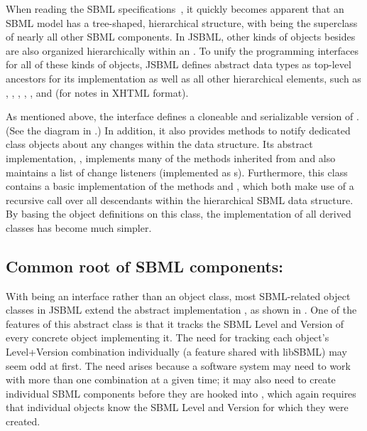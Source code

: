 When reading the SBML specifications~\citep{Hucka2003, Hucka2008,
  Hucka2010a},  it quickly becomes apparent that
an SBML model has a tree-shaped, hierarchical structure, with \SBase being
the superclass of nearly all other SBML components. In JSBML, other kinds of
objects besides \SBase are also organized hierarchically within an
\SBMLDocument.  To unify the programming interfaces for all of these kinds
of objects, JSBML defines abstract data types as top-level ancestors for
its \SBase implementation as well as all other hierarchical elements, such
as \Annotation, \ASTNode, \Creator, \CVTerm, \History, and \XMLNode (for
notes in XHTML  format).

As mentioned above, the interface \TreeNodeWithChangeSupport defines a
cloneable and serializable version of \TreeNode. (See the diagram in
.) In addition, it also provides methods to notify
dedicated \TreeNodeChangeListener class objects about any changes within
the data structure. Its abstract implementation, \AbstractTreeNode,
implements many of the methods inherited from \TreeNodeWithChangeSupport
and also maintains a list of change listeners (implemented as
\TreeNodeChangeListener{}s). Furthermore, this class contains a basic
implementation of the methods  and , which both
make use of a recursive call over all descendants within the hierarchical
SBML data structure. By basing the object definitions on this class, the
implementation of all derived classes has become much simpler.


\subsection{Common root of SBML components: }

With \SBase being an interface rather than an object class, most SBML-related
object classes in JSBML extend the abstract implementation \AbstractSBase, as
shown in .  One of the features of this abstract class is
that it tracks the SBML Level and Version of every concrete object
implementing it.  The need for tracking each object's Level+Version
combination individually (a feature shared with libSBML) may seem odd at
first.  The need arises because a software system may need to work with more
than one combination at a given time; it may also need to create individual
SBML components before they are hooked into \SBMLDocument, which again
requires that individual objects know the SBML Level and Version for which
they were created.


